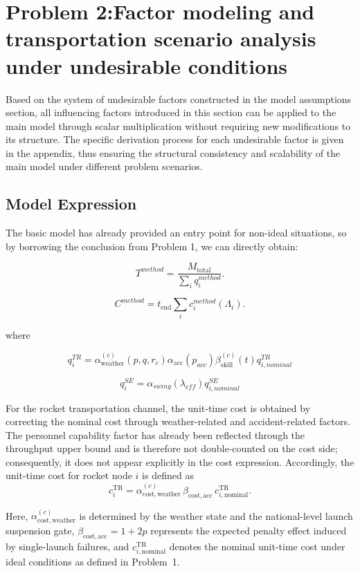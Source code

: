 \documentclass[12pt]{article}
\begin{document}
\section{Problem 2:Factor modeling and transportation scenario analysis under undesirable conditions}

Based on the system of undesirable factors constructed in the model assumptions section, all influencing factors introduced in this section can be applied to the main model through scalar multiplication without requiring new modifications to its structure. The specific derivation process for each undesirable factor is given in the appendix, thus ensuring the structural consistency and scalability of the main model under different problem scenarios.

\subsection{Model Expression}

The basic model has already provided an entry point for non-ideal situations, so by borrowing the conclusion from Problem 1, we can directly obtain:

\[
T^{method} = \frac{M_{\text{total}}}{\sum_i q_i^{method}} .
\]

\[
C^{method} = t_{\text{end}} \sum_i c_i^{method}(\Lambda_i) .
\]

where

\[
q_i^{TR}=\alpha^{(c)}_{\text{weather}}(p,q,r_c)\alpha_{\text{acc}}(p_{acc})\beta_{\text{skill}}^{(c)}(t) q_{i,nominal}^{TR}
\]

\[
q_i^{SE}=\alpha_{swing}(\lambda_{eff}) q_{i,nominal}^{SE}
\]

For the rocket transportation channel, the unit-time cost is obtained by correcting the nominal cost through weather-related and accident-related factors. The personnel capability factor has already been reflected through the throughput upper bound and is therefore not double-counted on the cost side; consequently, it does not appear explicitly in the cost expression. Accordingly, the unit-time cost for rocket node $i$ is defined as
\[
c_i^{\mathrm{TR}}
=
\alpha_{\mathrm{cost,weather}}^{(c)} \,
\beta_{\mathrm{cost,acc}} \,
c_{i,\mathrm{nominal}}^{\mathrm{TR}} .
\]

Here,
$\alpha_{\mathrm{cost,weather}}^{(c)}$ is determined by the weather state and the national-level launch suspension gate,
$\beta_{\mathrm{cost,acc}} = 1 + 2p$ represents the expected penalty effect induced by single-launch failures,
and $c_{i,\mathrm{nominal}}^{\mathrm{TR}}$ denotes the nominal unit-time cost under ideal conditions as defined in Problem~1.
\end{document}
